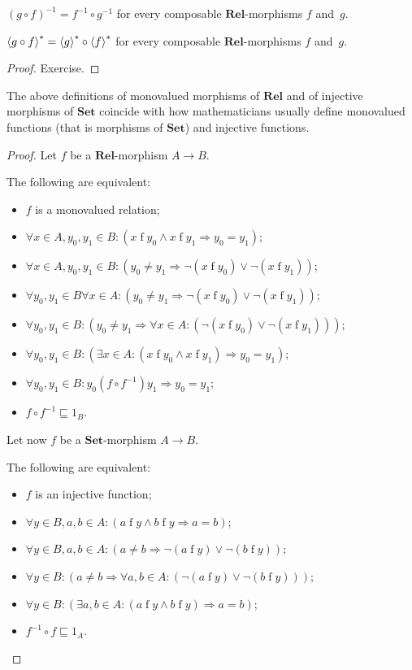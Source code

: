 \begin{obvious}
$(g\circ f)^{-1}=f^{-1}\circ g^{-1}$ for every composable $\mathbf{Rel}$-morphisms
$f$ and~$g$.\end{obvious}
\begin{prop}
$\left\langle g\circ f\right\rangle ^{\ast}=\left\langle g\right\rangle ^{\ast}\circ\left\langle f\right\rangle ^{\ast}$ for every composable
$\mathbf{Rel}$-morphisms $f$ and~$g$.\end{prop}
\begin{proof}
Exercise.\end{proof}
\begin{prop}
The above definitions of monovalued morphisms of $\mathbf{Rel}$ and
of injective morphisms of $\mathbf{Set}$ coincide with how mathematicians
usually define monovalued functions (that is morphisms of $\mathbf{Set}$)
and injective functions.\end{prop}
\begin{proof}
Let $f$ be a $\mathbf{Rel}$-morphism $A\rightarrow B$.

The following are equivalent:
\begin{itemize}
\item $f$ is a monovalued relation;
\item $\forall x\in A,y_{0},y_{1}\in B:(x\mathrel fy_{0}\land x\mathrel fy_{1}\Rightarrow y_{0}=y_{1})$;
\item $\forall x\in A,y_{0},y_{1}\in B:(y_{0}\ne y_{1}\Rightarrow\lnot(x\mathrel fy_{0})\lor\lnot(x\mathrel fy_{1}))$;
\item $\forall y_{0},y_{1}\in B\forall x\in A:(y_{0}\ne y_{1}\Rightarrow\lnot(x\mathrel fy_{0})\lor\lnot(x\mathrel fy_{1}))$;
\item $\forall y_{0},y_{1}\in B:(y_{0}\ne y_{1}\Rightarrow\forall x\in A:(\lnot(x\mathrel fy_{0})\lor\lnot(x\mathrel fy_{1})))$;
\item $\forall y_{0},y_{1}\in B:(\exists x\in A:(x\mathrel fy_{0}\land x\mathrel fy_{1})\Rightarrow y_{0}=y_{1})$;
\item $\forall y_{0},y_{1}\in B:y_{0}\mathrel{(f\circ f^{-1})}y_{1}\Rightarrow y_{0}=y_{1}$;
\item $f\circ f^{-1}\sqsubseteq1_{B}$.
\end{itemize}
Let now $f$ be a $\mathbf{Set}$-morphism $A\rightarrow B$.

The following are equivalent:
\begin{itemize}
\item $f$ is an injective function;
\item $\forall y\in B,a,b\in A:(a\mathrel fy\land b\mathrel fy\Rightarrow a=b)$;
\item $\forall y\in B,a,b\in A:(a\ne b\Rightarrow\lnot(a\mathrel fy)\lor\lnot(b\mathrel fy))$;
\item $\forall y\in B:(a\ne b\Rightarrow\forall a,b\in A:(\lnot(a\mathrel fy)\lor\lnot(b\mathrel fy)))$;
\item $\forall y\in B:(\exists a,b\in A:(a\mathrel fy\land b\mathrel fy)\Rightarrow a=b)$;
\item $f^{-1}\circ f\sqsubseteq1_{A}$.
\end{itemize}
\end{proof}
